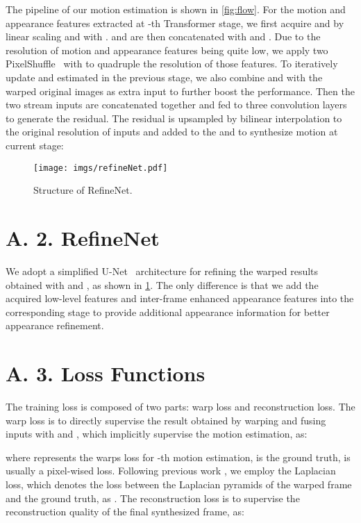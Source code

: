 \documentclass[10pt,twocolumn,letterpaper]{article}
\begin{document}
	The pipeline of our motion estimation is shown in \cref{fig:flow}. For the motion and appearance features extracted at -th Transformer stage, we first acquire  and  by linear scaling  and  with .  and  are then concatenated with  and . Due to the resolution of motion and appearance features being quite low, we apply two PixelShuffle~\cite{shi2016real} with  to quadruple the resolution of those features. To iteratively update  and  estimated in the previous stage, we also combine  and  with the warped original images as extra input to further boost the performance. Then the two stream inputs are concatenated together and fed to three convolution layers to generate the residual. The residual is upsampled by bilinear interpolation to the original resolution of inputs and added to the  and  to synthesize  motion at current stage:
	

\begin{figure}[t]
		\centering
		\texttt{[image: imgs/refineNet.pdf]}
		\caption{Structure of RefineNet.}
		\label{fig:refine}
		\vspace{-0.25in}
\end{figure}

\section*{A. 2. RefineNet}
We adopt a simplified U-Net~\cite{ronneberger2015u} architecture for refining the warped results  obtained with  and , as shown in \cref{fig:refine}. The only difference is that we add the acquired low-level features  and inter-frame enhanced appearance features  into the corresponding stage to provide additional appearance information for better appearance refinement.


\section*{A. 3. Loss Functions}The training loss is composed of two parts: warp loss and reconstruction loss. The warp loss is to directly supervise the result  obtained by warping and fusing inputs with  and , which implicitly supervise the motion estimation, as:

where  represents the warps loss for -th motion estimation,  is the ground truth,  is usually a pixel-wised loss. Following previous work \cite{niklaus2020softmax}, we employ the Laplacian loss, which denotes the  loss between the Laplacian pyramids of the warped frame and the ground truth, as . The reconstruction loss is to supervise the reconstruction quality of the final synthesized frame, as:
\end{document}
